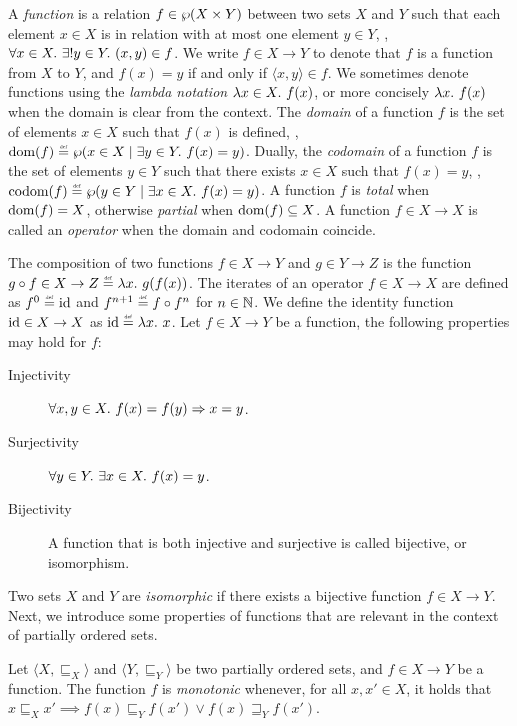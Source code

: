 A \emph{function} is a relation $f\in\wp(X \times Y)$ between two sets $X$ and $Y$ such that each element $x \in X$ is in relation with at most one element $y \in Y$, \ie, $\forall x \in X.~ \exists! y \in Y.~ (x, y) \in f$. We write $f \in X \to Y$ to denote that $f$ is a function from $X$ to $Y$, and $f(x) = y$ if and only if $\langle x, y \rangle \in f$.
We sometimes denote functions using the \emph{lambda notation} $\lambda x \in X.~ f(x)$, or more concisely $\lambda x.~ f(x)$ when the domain is clear from the context.
The \emph{domain} of a function $f$ is the set of elements $x \in X$ such that $f(x)$ is defined, \ie, $\dom(f) \defeq \setof{x \in X \mid \exists y \in Y.\spacer f(x) = y}$. Dually, the \emph{codomain} of a function $f$ is the set of elements $y \in Y$ such that there exists $x \in X$ such that $f(x) = y$, \ie, $\codom(f) \defeq \setof{y \in Y \mid \exists x \in X.\spacer f(x) = y}$. A function $f$ is \emph{total} when $\textup{dom}(f) = X$, otherwise \emph{partial} when $\textup{dom}(f) \subseteq X$.
A function $f\in X \to X$ is called an \emph{operator} when the domain and codomain coincide.

The {composition} of two functions $f \in X \to Y$ and $g \in Y \to Z$ is the function $g \circ f \in X \to Z \defeq \lambda x.\spacer g(f(x))$.
The {iterates} of an operator $f \in X \to X$ are defined as $f^0 \defeq \identity$ and $f^{n+1} \defeq f \circ f^n$ for $n \in \mathbb{N}$.
We define the {identity} function $\textup{id}\in X \to X$ as $\identity \defeq \lambda x.\spacer x$.
Let $f \in X \to Y$ be a function, the following properties may hold for $f$:
\begin{description}
  \item[Injectivity] $\forall x, y \in X.~ f(x) = f(y) \Rightarrow x = y$.
  \item[Surjectivity] $\forall y \in Y.~ \exists x \in X.~ f(x) = y$.
  \item[Bijectivity] A function that is both injective and surjective is called bijective, or isomorphism.
\end{description}
Two sets $X$ and $Y$ are \emph{isomorphic} if there exists a bijective function $f \in X \to Y$.
%
Next, we introduce some properties of functions that are relevant in the context of partially ordered sets.

\begin{definition}[Monotonicity]
  Let $\langle X, \sqsubseteq_X \rangle$ and $\langle Y, \sqsubseteq_Y \rangle$ be two partially ordered sets, and $f\in X \to Y$ be a function.
  The function $f$ is \emph{monotonic} whenever, for all $x, x' \in X$, it holds that $x \sqsubseteq_X x' \implies f(x) \sqsubseteq_Y f(x') \lor f(x) \sqsupseteq_Y f(x')$.
\end{definition}

